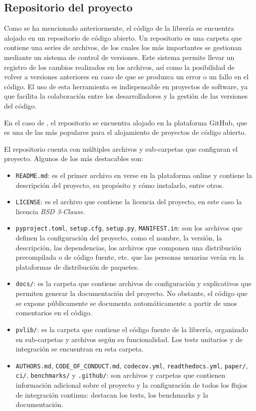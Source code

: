 \subsection{Repositorio del proyecto} \label{ssct:pvlib:repositorio}

Como se ha mencionado anteriormente, el código de la librería \pvlibpy{} se encuentra alojado en un repositorio de código abierto. Un repositorio es una carpeta que contiene una series de archivos, de los cuales los más importantes se gestionan mediante un sistema de control de versiones. Este sistema permite llevar un registro de los cambios realizados en los archivos, así como la posibilidad de volver a versiones anteriores en caso de que se produzca un error o un fallo en el código. El uso de esta herramienta es indispensable en proyectos de software, ya que facilita la colaboración entre los desarrolladores y la gestión de las versiones del código.

En el caso de \pvlibpy, el repositorio se encuentra alojado en la plataforma GitHub, que es una de las más populares para el alojamiento de proyectos de código abierto.

El repositorio cuenta con múltiples archivos y sub-carpetas que configuran el proyecto. Algunos de los más destacables son:

\begin{itemize}
    \item \texttt{README.md}: es el primer archivo en verse en la plataforma online y contiene la descripción del proyecto, su propósito y cómo instalarlo, entre otros.
    \item \texttt{LICENSE}: es el archivo que contiene la licencia del proyecto, en este caso la licencia \textit{BSD 3-Clause}.
    \item \texttt{pyproject.toml}, \texttt{setup.cfg}, \texttt{setup.py}, \texttt{MANIFEST.in}: son los archivos que definen la configuración del proyecto, como el nombre, la versión, la descripción, las dependencias, los archivos que componen una distribución precompilada o de código fuente, etc. que las personas usuarias verán en la plataformas de distribución de paquetes.
    \item \texttt{docs/}: es la carpeta que contiene archivos de configuración y explicativos que permiten generar la documentación del proyecto. No obstante, el código que se expone públicamente se documenta automáticamente a partir de unos comentarios en el código.
    \item \texttt{pvlib/}: es la carpeta que contiene el código fuente de la librería, organizado en sub-carpetas y archivos según su funcionalidad. Los tests unitarios y de integración se encuentran en esta carpeta.
    \item \texttt{AUTHORS.md}, \texttt{CODE\_OF\_CONDUCT.md}, \texttt{codecov.yml}, \texttt{readthedocs.yml}, \texttt{paper/}, \texttt{ci/}, \texttt{benchmarks/} y \texttt{.github/}: son archivos y carpetas que contienen información adicional sobre el proyecto y la configuración de todos los flujos de integración continua: destacan los tests, los benchmarks y la documentación.

\end{itemize}

